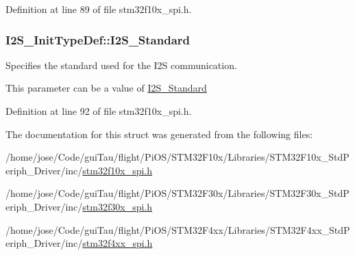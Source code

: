 Definition at line 89 of file stm32f10x\-\_\-spi.\-h.

\hypertarget{struct_i2_s___init_type_def_ae987936e7cb9a962ee388c98f8c872b7}{
\subsubsection[{I2\-S\-\_\-\-Standard}]{ I2\-S\-\_\-\-Init\-Type\-Def\-::\-I2\-S\-\_\-\-Standard}}\label{struct_i2_s___init_type_def_ae987936e7cb9a962ee388c98f8c872b7}
\begin{DoxyVerb}     Specifies the standard used for the I2S communication.
\end{DoxyVerb}
 This parameter can be a value of \hyperlink{group___i2_s___standard}{I2\-S\-\_\-\-Standard} 

Definition at line 92 of file stm32f10x\-\_\-spi.\-h.



The documentation for this struct was generated from the following files\-:\begin{DoxyCompactItemize}
\item 
/home/jose/\-Code/gui\-Tau/flight/\-Pi\-O\-S/\-S\-T\-M32\-F10x/\-Libraries/\-S\-T\-M32\-F10x\-\_\-\-Std\-Periph\-\_\-\-Driver/inc/\hyperlink{stm32f10x__spi_8h}{stm32f10x\-\_\-spi.\-h}\item 
/home/jose/\-Code/gui\-Tau/flight/\-Pi\-O\-S/\-S\-T\-M32\-F30x/\-Libraries/\-S\-T\-M32\-F30x\-\_\-\-Std\-Periph\-\_\-\-Driver/inc/\hyperlink{stm32f30x__spi_8h}{stm32f30x\-\_\-spi.\-h}\item 
/home/jose/\-Code/gui\-Tau/flight/\-Pi\-O\-S/\-S\-T\-M32\-F4xx/\-Libraries/\-S\-T\-M32\-F4xx\-\_\-\-Std\-Periph\-\_\-\-Driver/inc/\hyperlink{stm32f4xx__spi_8h}{stm32f4xx\-\_\-spi.\-h}\end{DoxyCompactItemize}
